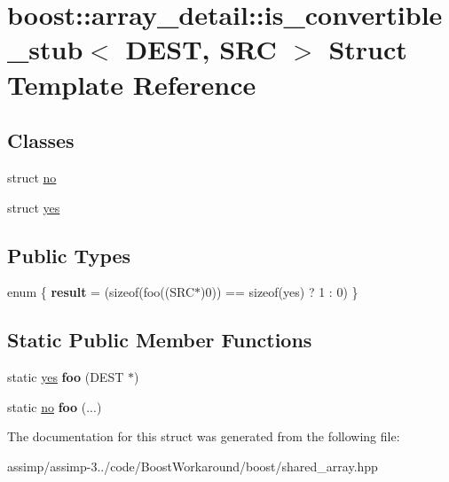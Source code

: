 \hypertarget{structboost_1_1array__detail_1_1is__convertible__stub}{\section{boost\+:\+:array\+\_\+detail\+:\+:is\+\_\+convertible\+\_\+stub$<$ D\+E\+S\+T, S\+R\+C $>$ Struct Template Reference}
\label{structboost_1_1array__detail_1_1is__convertible__stub}
}
\subsection*{Classes}
\begin{DoxyCompactItemize}
\item 
struct \hyperlink{structboost_1_1array__detail_1_1is__convertible__stub_1_1no}{no}
\item 
struct \hyperlink{structboost_1_1array__detail_1_1is__convertible__stub_1_1yes}{yes}
\end{DoxyCompactItemize}
\subsection*{Public Types}
\begin{DoxyCompactItemize}
\item 
\hypertarget{structboost_1_1array__detail_1_1is__convertible__stub_a32ddff6b192f1866d1a87f702dca01a4}{enum \{ {\bfseries result} = (sizeof(foo((S\+R\+C$\ast$)0)) == sizeof(yes) ? 1 \+: 0)
 \}}\label{structboost_1_1array__detail_1_1is__convertible__stub_a32ddff6b192f1866d1a87f702dca01a4}

\end{DoxyCompactItemize}
\subsection*{Static Public Member Functions}
\begin{DoxyCompactItemize}
\item 
\hypertarget{structboost_1_1array__detail_1_1is__convertible__stub_adc61af8116f7192862779f3e2644780d}{static \hyperlink{structboost_1_1array__detail_1_1is__convertible__stub_1_1yes}{yes} {\bfseries foo} (D\+E\+S\+T $\ast$)}\label{structboost_1_1array__detail_1_1is__convertible__stub_adc61af8116f7192862779f3e2644780d}

\item 
\hypertarget{structboost_1_1array__detail_1_1is__convertible__stub_ac62e5f42878252001c27b3f52e3ed35f}{static \hyperlink{structboost_1_1array__detail_1_1is__convertible__stub_1_1no}{no} {\bfseries foo} (...)}\label{structboost_1_1array__detail_1_1is__convertible__stub_ac62e5f42878252001c27b3f52e3ed35f}

\end{DoxyCompactItemize}


The documentation for this struct was generated from the following file\+:\begin{DoxyCompactItemize}
\item 
assimp/assimp-\/3../code/\+Boost\+Workaround/boost/shared\+\_\+array.\+hpp\end{DoxyCompactItemize}
